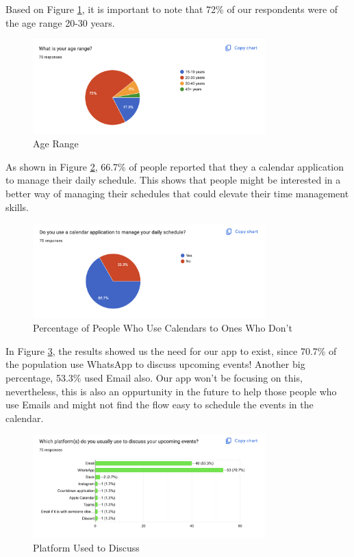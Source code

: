 \documentclass[12pt,a4paper]{report}
\begin{document}
Based on Figure \ref{fig:age-range}, it is important to note that 72\% of our respondents were of the age range 20-30 years.

\begin{figure}[!h]
    \centering
    \includegraphics[width=0.8\textwidth]{images/survey/age.png}
    \caption{Age Range}
    \label{fig:age-range}
\end{figure}

As shown in Figure \ref{fig:use-calendar}, 66.7\% of people reported that they a calendar application to manage their daily schedule. This shows that people might be interested in a better way of managing their schedules that could elevate their time management skills.

\begin{figure}[!h]
    \centering
    \includegraphics[width=0.8\textwidth]{images/survey/use-calendar.png}
    \caption{Percentage of People Who Use Calendars to Ones Who Don't}
    \label{fig:use-calendar}
\end{figure}

In Figure \ref{fig:platform-to-discuss}, the results showed us the need for our app to exist, since 70.7\% of the population use WhatsApp to discuss upcoming events! Another big percentage, 53.3\% used Email also. Our app won't be focusing on this, nevertheless, this is also an oppurtunity in the future to help those people who use Emails and might not find the flow easy to schedule the events in the calendar.

\begin{figure}[!h]
    \centering
    \includegraphics[width=0.8\textwidth]{images/survey/platform-to-discuss.png}
    \caption{Platform Used to Discuss}
    \label{fig:platform-to-discuss}
\end{figure}
\end{document}

